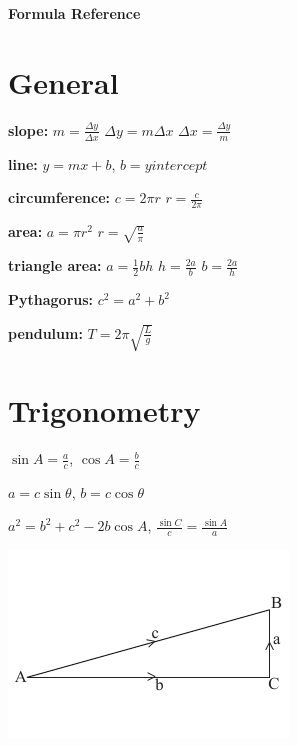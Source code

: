 \documentclass[11pt]{article}
\begin{document}
\doublespacing

\begin{center}
\Large \textbf{Formula Reference} \normalsize
\end{center}

\section{General}
\begin{multicols}{2}

\textbf{slope:} $m=\frac{\Delta y}{\Delta x}$ \overrightarrow{} $\Delta y=m\Delta x$ \overrightarrow{} $\Delta x=\frac{\Delta y}{m}$

\textbf{line:} $y=mx+b$, $b=y intercept$

\textbf{circumference:} $c=2\pi r$ \overrightarrow{} $r=\frac{c}{2\pi}$

\textbf{area:} $a=\pi r^2$ \overrightarrow{} $r=\sqrt{\frac{a}{\pi}}$

\textbf{triangle area:} $a=\frac{1}{2}bh$ \overrightarrow{} $h=\frac{2a}{b}$ \overrightarrow{} $b=\frac{2a}{h}$

\textbf{Pythagorus:} $c^2=a^2+b^2$

\textbf{pendulum:} $T=2\pi\sqrt{\frac{L}{g}}$

\end{multicols}

\section{Trigonometry}
\begin{multicols}{2}

$\sin A=\frac{a}{c}$, $\cos A=\frac{b}{c}$

$a=c\sin\theta$, $b=c\cos\theta$

$a^2=b^2+c^2-2b\cos A$, $\frac{\sin C}{c}=\frac{\sin A}{a}$

\includegraphics[bb=0 60 0 -50]{triangle.pdf}
\end{multicols}
\end{document}

